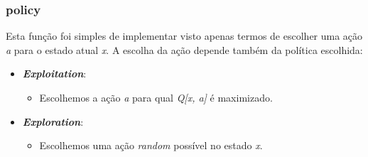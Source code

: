 \documentclass[9pt, a4paper, twocolumn]{article}
\begin{document}
\subsubsection{policy}
\hspace{10mm} Esta função foi simples de implementar visto apenas termos de escolher uma ação \emph{a} para o estado atual \emph{x}. A escolha da ação depende também da política escolhida:
\begin{itemize}
\item \emph{\textbf{Exploitation}}:
\begin{itemize}
\item Escolhemos a ação \emph{a} para qual \emph{Q[x, a]} é maximizado.
\end{itemize}
\item \emph{\textbf{Exploration}}:
\begin{itemize}
\item Escolhemos uma ação \emph{random} possível no estado \emph{x}.
\end{itemize}
\end{itemize}
\end{document}
